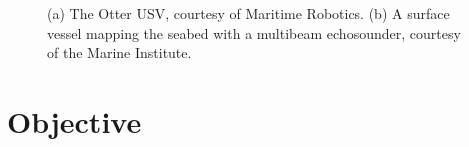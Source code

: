 \begin{figure}[h!]
    \centering
	\caption[The Otter USV and seabed mapping.]{(a) The Otter USV, courtesy of Maritime Robotics. (b) A surface vessel mapping the seabed with a multibeam echosounder, courtesy of the Marine Institute.} \label{fig:background}
\end{figure}

\section{Objective}

